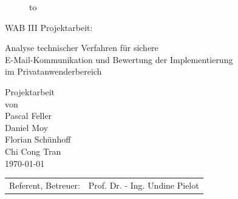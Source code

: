 \begin{titlepage}
\begin{figure}
  \begin{center}
    \hbox to 
  \end{center}
\end{figure}

\begin{center}
\rule{0pt}{0pt}
\vfill
\vfill
\vfill
\vfill

\begin{huge}
WAB III Projektarbeit:\\[0.75ex]
\begin{Large}
Analyse technischer Verfahren für sichere\\[0.75ex]
E-Mail-Kommunikation und Bewertung der Implementierung\\[0.75ex]
im Privatanwenderbereich\\[0.75ex]
\end{Large}

\end{huge}

\vfill
\vfill

Projektarbeit\\ von\\

\vspace*{.5cm}
Pascal Feller\\
Daniel Moy\\
Florian Schünhoff\\
Chi Cong Tran\\
\vspace{.5cm}
\today\\

\vfill
\vfill
\vfill
\vfill

\begin{tabular}{rl}
Referent, Betreuer:   & Prof. Dr. - Ing. Undine Pielot\\
\end{tabular}
\end{center}
\end{titlepage}



